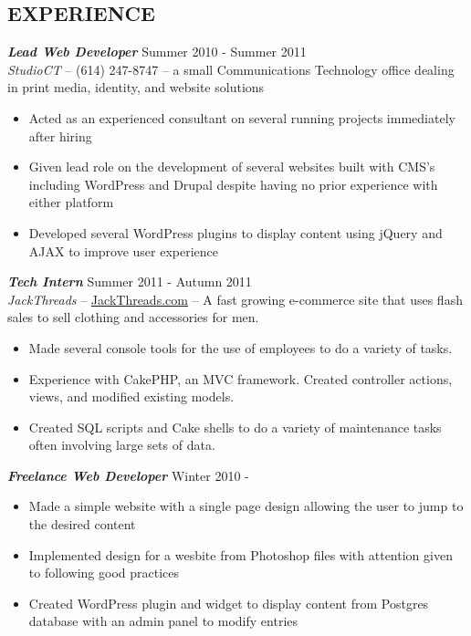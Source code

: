 \documentclass[line,margin=.2,letterpaper]{res}
\begin{document}
\begin{resume}
\section{\uppercase{Experience}} {\sl\textbf{Lead Web Developer}} \hfill Summer 2010 - Summer 2011\\
	\emph{StudioCT} -- (614) 247-8747 -- a small Communications Technology office dealing in print media, identity, 
	and website solutions 
	\vspace{5pt}
	\begin{itemize}  
	    \item Acted as an experienced consultant on several running projects immediately after hiring
	    \item Given lead role on the development of several websites built with CMS's including WordPress and Drupal despite having no prior experience with either platform
	    \item Developed several WordPress plugins to display content using jQuery and AJAX to improve user experience
	\end{itemize}

	{\sl\textbf{Tech Intern}} \hfill Summer 2011 - Autumn 2011 \\
	\emph{JackThreads} -- \href{http://www.jackthreads.com/}{JackThreads.com}  -- A fast growing e-commerce site that uses flash sales to sell clothing and accessories for men.
	\vspace{5pt}
	 \begin{itemize}  
	     \item Made several console tools for the use of employees to do a variety of tasks.
	     \item Experience with CakePHP, an MVC framework. Created controller actions, views, and modified existing models.
	     \item Created SQL scripts and Cake shells to do a variety of maintenance tasks often involving large sets of data.
	 \end{itemize} 

	{\sl\textbf{Freelance Web Developer}} \hfill Winter 2010 - \\
	\vspace{-8pt}
	 \begin{itemize}  
	     \item Made a simple website with a single page design allowing the user to jump to the desired content
	     \item Implemented design for a wesbite from Photoshop files with attention given to following good practices
	     \item Created WordPress plugin and widget to display content from Postgres database with an admin panel to modify entries
	 \end{itemize} 
                 

\end{resume}
\end{document}
